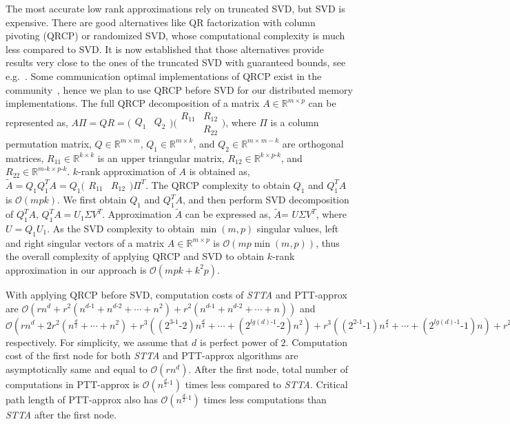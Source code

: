 \documentclass[sigconf]{acmart}
\newcommand{\otta}{{\it STTA}\xspace}
\begin{document}
The most accurate low rank approximations rely on truncated SVD, but SVD is expensive. There are good alternatives like QR factorization with column pivoting (QRCP) or randomized SVD, whose computational complexity is much less compared to SVD. It is now established that those alternatives provide results very close to the ones of the truncated SVD with guaranteed bounds, see e.g.~\cite{demmel19:_improv_analy_and_unified_persp}. Some communication optimal implementations of QRCP exist in the community~\cite{beaupere-tournamentpivoting}, hence we plan to use QRCP before SVD for our distributed memory implementations. The full QRCP decomposition of a matrix $A\in \mathbb{R}^{m\times p}$ can be represented as, $A\Pi = QR = \big(\begin{smallmatrix} Q_1 & Q_2 \end{smallmatrix}\big) \big(\begin{smallmatrix}R_{11} & R_{12}\\ & R_{22} \end{smallmatrix}\big)$, where $\Pi$ is a column permutation matrix, $Q\in \mathbb{R}^{m\times m}$, $Q_1\in \mathbb{R}^{m\times k}$, and $Q_2\in \mathbb{R}^{m\times m-k}$ are orthogonal matrices, $R_{11} \in \mathbb{R}^{k\times k}$ is an upper triangular matrix, $R_{12}\in\mathbb{R}^{k\times p\text{-}k}$, and $R_{22}\in\mathbb{R}^{m\text{-}k\times p\text{-}k}$. $k$-rank approximation of $A$ is obtained as, $\tilde{A} = Q_1Q_1^TA = Q_1 \big(\begin{smallmatrix} R_{11} & R_{12} \end{smallmatrix}\big)\Pi^T$. The QRCP complexity to obtain $Q_1$ and $Q_1^TA$ is $\mathcal{O}(mpk)$. We first obtain $Q_1$ and $Q_1^TA$, and then perform SVD decomposition of $Q_1^TA$, $Q_1^TA = U_1 \Sigma V^T$. Approximation $\tilde{A}$ can be expressed as, $\tilde{A}$= $U\Sigma V^T$, where $U=Q_1U_1$. As the SVD complexity to obtain $\min(m,p)$ singular values, left and right singular vectors of a matrix $A\in\mathbb{R}^{m\times p}$ is $\mathcal{O}(mp\min(m,p))$, thus the overall complexity of applying QRCP and SVD to obtain $k$-rank approximation in our approach is $\mathcal{O}(mpk + k^2p)$.     


With applying QRCP before SVD, computation costs of \otta and PTT-approx are $\mathcal{O}(rn^d + r^2 (n^{d\text{-}1} + n^{d\text{-}2} + \cdots  + n^2) + r^2 (n^{d\text{-}1} + n^{d\text{-}2} + \cdots + n))$ and $\mathcal{O}(rn^d + 2r^2(n^\frac{d}{2}+\cdots+n^2) + r^3 ((2^{3\text{-}1}\text{-}2)n^\frac{d}{4} + \cdots+ (2^{lg(d)\text{-}1}\text{-}2)n^2) + r^3((2^{2\text{-}1}\text{-}1)n^\frac{d}{4}+\cdots+(2^{lg(d)\text{-}1}\text{-}1)n) + r^2 (n^\frac{d}{2} +\cdots+n))$ respectively. For simplicity, we assume that $d$ is perfect power of $2$. Computation cost of the first node for both \otta and PTT-approx algorithms are asymptotically same and equal to $\mathcal{O}(rn^d)$. After the first node, total number of computations in PTT-approx is $\mathcal{O}(n^{\frac{d}{2}\text{-}1})$ times less compared to \otta. Critical path length of PTT-approx also has  $\mathcal{O}(n^{\frac{d}{2}\text{-}1})$ times less computations than \otta after the first node. 
\end{document}
